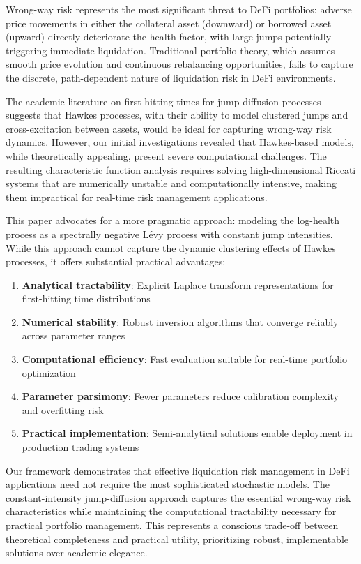 \documentclass{article}
\theoremstyle{definition}
\begin{document}
Wrong-way risk represents the most significant threat to DeFi portfolios: adverse price movements in either the collateral asset (downward) or borrowed asset (upward) directly deteriorate the health factor, with large jumps potentially triggering immediate liquidation. Traditional portfolio theory, which assumes smooth price evolution and continuous rebalancing opportunities, fails to capture the discrete, path-dependent nature of liquidation risk in DeFi environments.

The academic literature on first-hitting times for jump-diffusion processes suggests that Hawkes processes, with their ability to model clustered jumps and cross-excitation between assets, would be ideal for capturing wrong-way risk dynamics. However, our initial investigations revealed that Hawkes-based models, while theoretically appealing, present severe computational challenges. The resulting characteristic function analysis requires solving high-dimensional Riccati systems that are numerically unstable and computationally intensive, making them impractical for real-time risk management applications.

This paper advocates for a more pragmatic approach: modeling the log-health process as a spectrally negative Lévy process with constant jump intensities. While this approach cannot capture the dynamic clustering effects of Hawkes processes, it offers substantial practical advantages:

\begin{enumerate}
    \item \textbf{Analytical tractability}: Explicit Laplace transform representations for first-hitting time distributions
    \item \textbf{Numerical stability}: Robust inversion algorithms that converge reliably across parameter ranges
    \item \textbf{Computational efficiency}: Fast evaluation suitable for real-time portfolio optimization
    \item \textbf{Parameter parsimony}: Fewer parameters reduce calibration complexity and overfitting risk
    \item \textbf{Practical implementation}: Semi-analytical solutions enable deployment in production trading systems
\end{enumerate}

Our framework demonstrates that effective liquidation risk management in DeFi applications need not require the most sophisticated stochastic models. The constant-intensity jump-diffusion approach captures the essential wrong-way risk characteristics while maintaining the computational tractability necessary for practical portfolio management. This represents a conscious trade-off between theoretical completeness and practical utility, prioritizing robust, implementable solutions over academic elegance.
\end{document}
